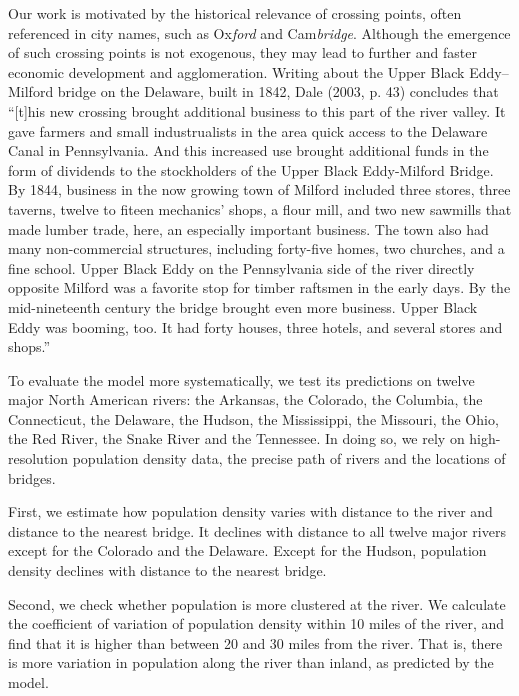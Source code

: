 \documentclass[12pt]{article}
\begin{document}
Our work is motivated by the historical relevance of crossing points, often
referenced in city names, such as Ox\emph{ford} and Cam\emph{bridge}.
Although the emergence of such crossing points is not exogenous, they may
lead to further and faster economic development and agglomeration. Writing
about the Upper Black Eddy--Milford bridge on the Delaware, built in 1842,
Dale (2003, p. 43) concludes that ``[t]his new crossing brought additional
business to this part of the river valley. It gave farmers and small
industrualists in the area quick access to the Delaware Canal in
Pennsylvania. And this increased use brought additional funds in the form of
dividends to the stockholders of the Upper Black Eddy-Milford Bridge. By
1844, business in the now growing town of Milford included three stores,
three taverns, twelve to fiteen mechanics' shops, a flour mill, and two new
sawmills that made lumber trade, here, an especially important business. The
town also had many non-commercial structures, including forty-five homes,
two churches, and a fine school. Upper Black Eddy on the Pennsylvania side
of the river directly opposite Milford was a favorite stop for timber
raftsmen in the early days. By the mid-nineteenth century the bridge brought
even more business. Upper Black Eddy was booming, too. It had forty houses,
three hotels, and several stores and shops.''

To evaluate the model more systematically, we test its predictions on twelve
major North American rivers: the Arkansas, the Colorado, the Columbia, the Connecticut, the Delaware, the Hudson, the Mississippi, the Missouri, the Ohio, the Red River, the Snake River and the Tennessee. In doing so, we rely on
high-resolution population density data, the precise path of rivers and the
locations of bridges.

First, we estimate how population density varies with distance to the river
and distance to the nearest bridge. It declines with distance to all twelve 
major rivers except for the Colorado and the Delaware. Except for the 
Hudson, population density declines with distance to the nearest bridge.

Second, we check whether population is more clustered at the river. We
calculate the coefficient of variation of population density within 10 miles
of the river, and find that it is higher than between 20 and 30 miles from
the river. That is, there is more variation in population along the river
than inland, as predicted by the model.
\end{document}
